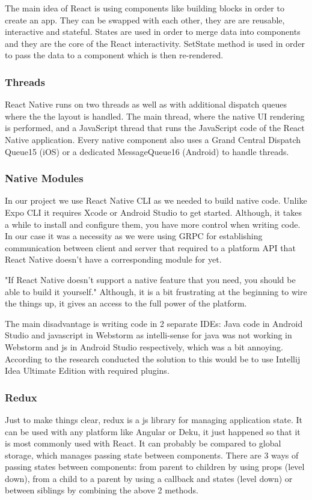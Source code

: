 The main idea of React is using components like building blocks in order to create an app. They can be swapped with each other, they are are reusable, interactive and stateful. 
States are used in order to merge data into components and they are the core of the React interactivity. SetState method is used in order to pass the data to a component which is then re-rendered.
\subsubsection{Threads}
React Native runs on two threads as well as with additional dispatch
queues where the the layout is handled. The main thread, where the native UI rendering is performed, and a JavaScript thread that runs the JavaScript code of the React Native application. Every native component also uses a Grand Central Dispatch
Queue15 (iOS) or a dedicated MessageQueue16 (Android) to handle threads.

\subsubsection{Native Modules}
In our project we use React Native CLI as we needed to build native code.
Unlike Expo CLI it requires Xcode or Android Studio to get started. Although, it takes a while to install and configure them, you have more control when writing code. In our case it was a necessity as we were using GRPC for establishing communication between client and server that required to a platform API that React Native doesn't have a corresponding module for yet.

"If React Native doesn't support a native feature that you need, you should be able to build it yourself." Although, it is a bit frustrating at the beginning to wire the things up, it gives an access to the full power of the platform. 

The main disadvantage is writing code in 2 separate IDEs: Java code in Android Studio and javascript in Webstorm as intelli-sense for java was not working in Webstorm and js in Android Studio respectively, which was a bit annoying. According to the research conducted the solution to this would be to use Intellij Idea Ultimate Edition with required plugins.


\subsubsection{Redux}
Just to make things clear, redux is a js library for managing application state.
It can be used with any platform like Angular or Deku, it just happened so that it is most commonly used with React.
It can probably be compared to global storage, which manages passing state between components.
There are 3 ways of passing states between components: from parent to children by using props (level down), from a child to a parent by using a callback and states (level down) or between siblings by combining the above 2 methods.

